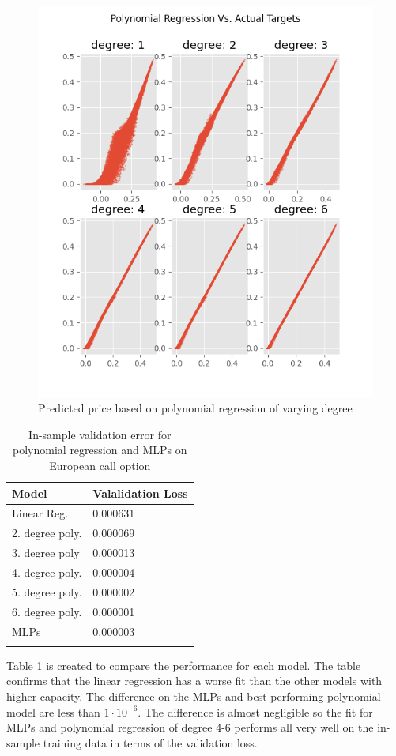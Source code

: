 \begin{figure}[H]
\centering
\includegraphics{Figures/polynomialEuroC.png}
\decoRule
\caption[Polynomial Regression Predictions Vs. Actual Prices]{Predicted price based on polynomial regression of varying degree}
\label{fig:PolynomialEuroC}
\end{figure}

\begin{table}[th]
\caption{In-sample validation error for polynomial regression and MLPs on European call option}
\label{tab:euroPerformance}
\centering
\begin{tabular}{l l}
\toprule
\textbf{Model} & \textbf{Valalidation Loss} \\
\midrule
Linear Reg. & 0.000631 \\
2. degree  poly.  & 0.000069 \\
3. degree poly & 0.000013\\
4. degree poly.  & 0.000004 \\
5. degree poly.  & 0.000002 \\
6. degree poly. & 0.000001\\
MLPs        & 0.000003\\
\bottomrule\\
\end{tabular}
\end{table}
Table \ref{tab:euroPerformance} is created to compare the performance for each model. The table confirms that the linear regression has a worse fit than the other models with higher capacity. The difference on the MLPs and best performing polynomial model are less than $1\cdot 10^{-6}$. The difference is almost negligible so the fit for MLPs and polynomial regression of degree 4-6 performs all very well on the in-sample training data in terms of the validation loss.

